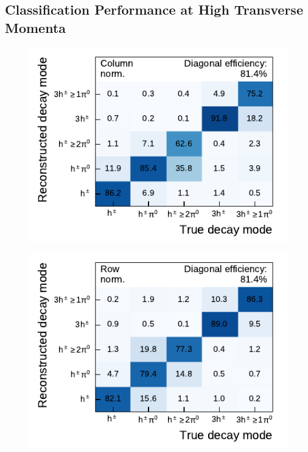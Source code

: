 \clearpage
\subsection{Classification Performance at High Transverse Momenta}
\label{sec:combined_high_pt_migration}

\noindent
\begin{minipage}{\textwidth}
  \captionsetup{type=figure}
  \begin{subfigure}{0.48\textwidth}
    \centering
    \includegraphics{./figures/decay_mode_classification/highpt/mig_mat_pt_less_100.pdf}
  \end{subfigure}\hfill
  \begin{subfigure}{0.48\textwidth}
    \centering
    \includegraphics{./figures/decay_mode_classification/highpt/comp_mat_pt_less_100.pdf}

\end{subfigure}
\end{minipage}
